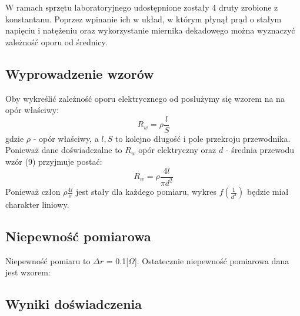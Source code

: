 \documentclass{article} %
\begin{document}
W ramach sprzętu laboratoryjnego udostępnione zostały 4 druty zrobione z konstantanu. Poprzez wpinanie ich w układ, w którym płynął prąd o stałym napięciu i natężeniu oraz wykorzystanie miernika dekadowego można wyznaczyć zależność oporu od średnicy.

\subsection{Wyprowadzenie wzorów}

Oby wykreślić zależność oporu elektrycznego od posłużymy się wzorem na na opór właściwy:
{\large
\begin{equation}
    R_w = \rho\frac{l}{S}
\end{equation}
}
gdzie $\rho$ - opór właściwy, a $l, S$ to kolejno długość i pole przekroju przewodnika. Ponieważ dane doświadczalne to $R_w$ opór elektryczny oraz $d$ - średnia przewodu wzór (9) przyjmuje postać:
{\large
\begin{equation}
    R_w = \rho\frac{4l}{\pi d^2}
\end{equation}
}
Ponieważ człon $\rho\frac{4l}{\pi}$ jest stały dla każdego pomiaru, wykres $f(\frac{1}{d^2})$ będzie miał charakter liniowy.
\subsection{Niepewność pomiarowa}

Niepewność pomiaru to $\Delta r$ = 0.1[$\Omega$].
Ostatecznie niepewność pomiarowa dana jest wzorem:

\subsection{Wyniki doświadczenia}
\end{document}
